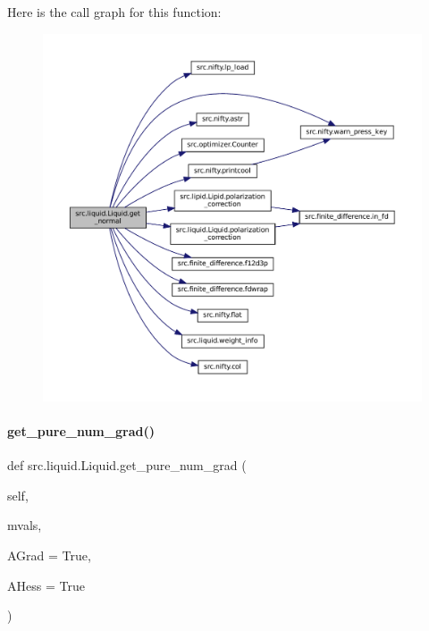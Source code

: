 Here is the call graph for this function\+:
\nopagebreak
\begin{figure}[H]
\begin{center}
\leavevmode
\includegraphics[width=350pt]{classsrc_1_1liquid_1_1Liquid_ae6a946b860b70f1b002acdff15fdb023_cgraph}
\end{center}
\end{figure}
\mbox{\label{classsrc_1_1liquid_1_1Liquid_adec909709edf0a79148d87d97ae2fde1}} 
\paragraph{\texorpdfstring{get\+\_\+pure\+\_\+num\+\_\+grad()}{get\_pure\_num\_grad()}}
{\footnotesize\ttfamily def src.\+liquid.\+Liquid.\+get\+\_\+pure\+\_\+num\+\_\+grad (\begin{DoxyParamCaption}\item[{}]{self,  }\item[{}]{mvals,  }\item[{}]{A\+Grad = {\ttfamily True},  }\item[{}]{A\+Hess = {\ttfamily True} }\end{DoxyParamCaption})}



